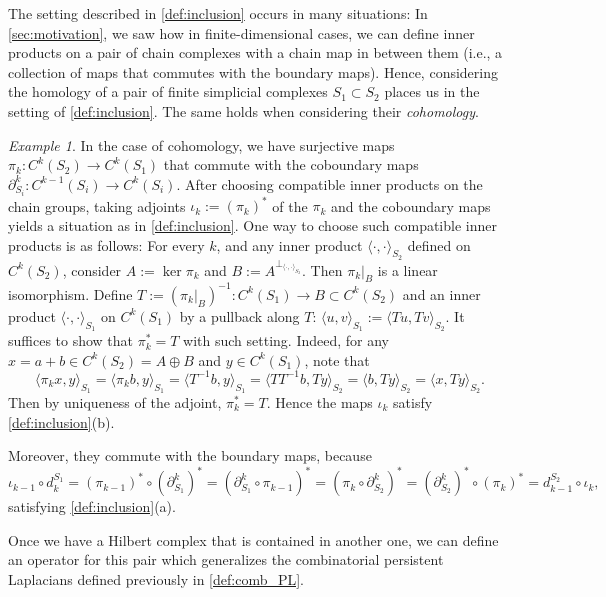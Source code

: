 \documentclass[11pt]{article}
\theoremstyle{definition}
\theoremstyle{remark}
\newtheorem{example}[theorem]{Example}
\begin{document}
The setting described in \cref{def:inclusion} occurs in many situations: In \cref{sec:motivation}, we saw how in finite-dimensional cases, we can define inner products on a pair of chain complexes with a chain map in between them (i.e., a collection of maps that commutes with the boundary maps). Hence, considering the homology of a pair of finite simplicial complexes $S_1 \subset S_2$ places us in the setting of \cref{def:inclusion}. The same holds when considering their \emph{cohomology}.
\begin{example} \label{ex:cohomology}
    In the case of cohomology, we have surjective maps $\pi_k:C^k(S_2) \rightarrow C^k(S_1)$ that commute with the coboundary maps $\partial^k_{S_i}:C^{k-1}(S_i) \to C^k(S_i)$. After choosing compatible inner products on the chain groups, taking adjoints $\iota_k:=(\pi_k)^*$ of the $\pi_k$ and the coboundary maps yields a situation as in \cref{def:inclusion}. One way to choose such compatible inner products is as follows: For every $k$, and any inner product $\langle\cdot,\cdot\rangle_{S_2}$ defined on $C^k(S_2)$, consider $A:=\ker \pi_k$ and $B:=A^{\perp_{\langle\cdot,\cdot\rangle_{S_2}}}$. Then $\pi_k|_{B}$ is a linear isomorphism. Define $T:=(\pi_k|_{B})^{-1}:C^k(S_1)\to B\subset C^k(S_2)$ and an inner product $\langle\cdot,\cdot\rangle_{S_1}$ on $C^k(S_1)$ by a pullback along $T$:
    $\langle u,v\rangle_{S_1}:=\langle Tu,Tv\rangle_{S_2}.$
    It suffices to show that $\pi_k^*=T$ with such setting. Indeed, for any $x=a+b\in C^k(S_2)=A\oplus B$ and $y\in C^k(S_1)$, note that
    $$\langle\pi_kx,y\rangle_{S_1}=\langle \pi_k b,y\rangle_{S_1}=\langle T^{-1}b,y\rangle_{S_1}=\langle TT^{-1}b,Ty \rangle_{S_2}=\langle b,Ty\rangle_{S_2}=\langle x,Ty\rangle_{S_2}.$$
    Then by uniqueness of the adjoint, $\pi_k^*=T$. Hence the maps $\iota_k$ satisfy \cref{def:inclusion}(b). 
    
Moreover, they commute with the boundary maps, because $$\iota_{k-1} \circ d_k^{S_1}= (\pi_{k-1})^* \circ (\partial^k_{S_1})^* = ( \partial^k_{S_1} \circ \pi_{k-1})^* = ( \pi_{k} \circ\partial^k_{S_2} )^*=(\partial^k_{S_2})^* \circ (\pi_k)^* = d_{k-1}^{S_2} \circ \iota_k,$$
satisfying \cref{def:inclusion}(a).
\end{example} 

Once we have a Hilbert complex that is contained in another one, we can define an operator for this pair which generalizes the combinatorial persistent Laplacians defined previously in \cref{def:comb_PL}.
\end{document}
